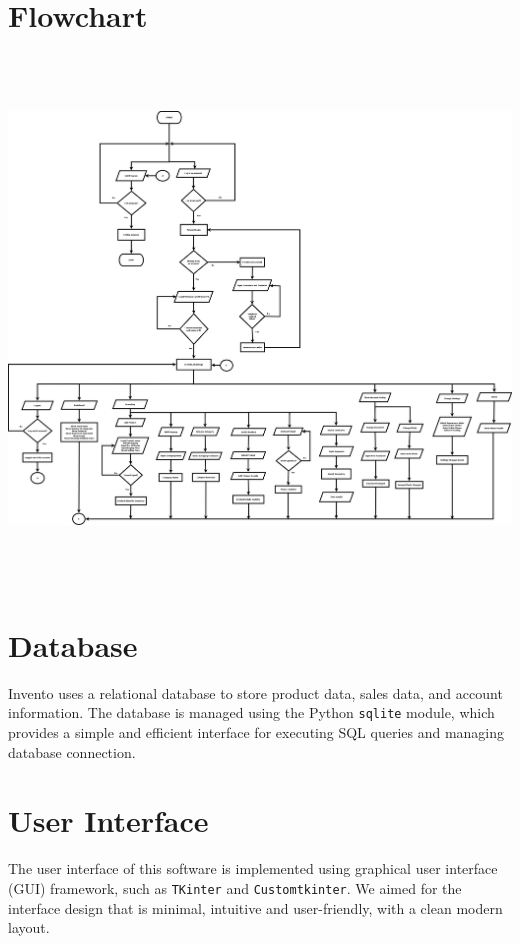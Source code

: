 \documentclass[12pt,a4paper]{article}
\renewcommand{\indent}{\hspace\parindent}
\begin{document}
    \section*{Flowchart}
        \includegraphics[width=\textwidth,height=5.5in]{Flowchart.png}

    \section*{Database}

        \indent
        Invento uses a relational database to store product data, sales data, and 
        account information. The database is managed using the Python \texttt{sqlite} 
        module, which provides a simple and efficient interface for executing SQL 
        queries and managing database connection.

    \section*{User Interface}

        \indent
        The user interface of this software is implemented using graphical user 
        interface (GUI) framework, such as \texttt{TKinter} and \texttt{Customtkinter}. We aimed for the interface design that is minimal, intuitive and user-friendly, 
        with a clean modern layout.
\end{document}
